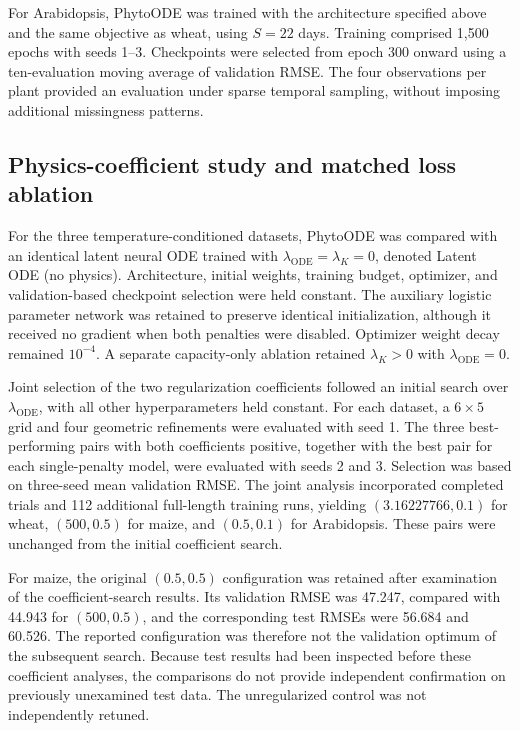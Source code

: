 \documentclass[preprint,12pt,authoryear]{elsarticle}
\newcommand{\model}{PhytoODE}
\begin{document}
For Arabidopsis, PhytoODE was trained with the architecture specified above and the same objective as wheat, using $S=22$ days. Training comprised 1,500 epochs with seeds 1--3. Checkpoints were selected from epoch 300 onward using a ten-evaluation moving average of validation RMSE. The four observations per plant provided an evaluation under sparse temporal sampling, without imposing additional missingness patterns.

\subsection{Physics-coefficient study and matched loss ablation}
\label{subsec:physicsablationmethods}

For the three temperature-conditioned datasets, \model{} was compared with an identical latent neural ODE trained with $\lambda_{\mathrm{ODE}}=\lambda_K=0$, denoted Latent ODE (no physics). Architecture, initial weights, training budget, optimizer, and validation-based checkpoint selection were held constant. The auxiliary logistic parameter network was retained to preserve identical initialization, although it received no gradient when both penalties were disabled. Optimizer weight decay remained $10^{-4}$. A separate capacity-only ablation retained $\lambda_K>0$ with $\lambda_{\mathrm{ODE}}=0$.

Joint selection of the two regularization coefficients followed an initial search over $\lambda_{\mathrm{ODE}}$, with all other hyperparameters held constant. For each dataset, a $6\times5$ grid and four geometric refinements were evaluated with seed 1. The three best-performing pairs with both coefficients positive, together with the best pair for each single-penalty model, were evaluated with seeds 2 and 3. Selection was based on three-seed mean validation RMSE. The joint analysis incorporated completed trials and 112 additional full-length training runs, yielding $(3.16227766,0.1)$ for wheat, $(500,0.5)$ for maize, and $(0.5,0.1)$ for Arabidopsis. These pairs were unchanged from the initial coefficient search.

For maize, the original $(0.5,0.5)$ configuration was retained after examination of the coefficient-search results. Its validation RMSE was 47.247, compared with 44.943 for $(500,0.5)$, and the corresponding test RMSEs were 56.684 and 60.526. The reported configuration was therefore not the validation optimum of the subsequent search. Because test results had been inspected before these coefficient analyses, the comparisons do not provide independent confirmation on previously unexamined test data. The unregularized control was not independently retuned.
\end{document}
